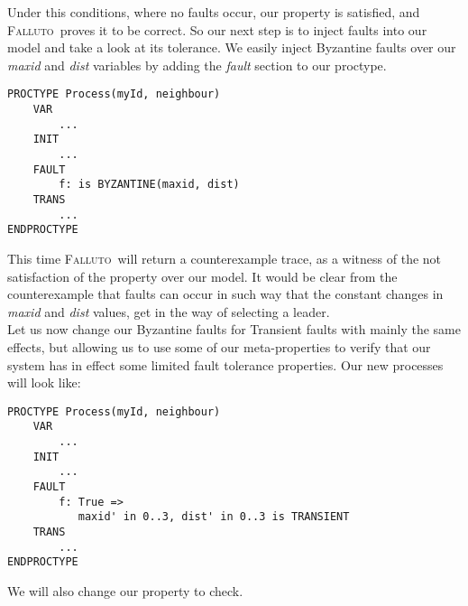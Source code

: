 \documentclass{llncs2e/llncs}
\newcommand{\fallutoSp}{\nohyphens{\textsc{Falluto~}}}  %
\begin{document}
\vspace{-0.2cm}
\noindent Under this conditions, where no faults occur, our property is satisfied, and \fallutoSp proves it to be correct. So our next step is to inject faults into our model and take a look at its tolerance. We easily inject Byzantine faults over our \textit{maxid} and \textit{dist} variables by adding the \textit{fault} section to our proctype.
\vspace{-0.2cm}
\begin{shaded}
\vspace{-0.5cm}
\begin{verbatim}
PROCTYPE Process(myId, neighbour)
    VAR
        ...
    INIT
        ...
    FAULT
        f: is BYZANTINE(maxid, dist)
    TRANS
        ...
ENDPROCTYPE
\end{verbatim}
\vspace{-0.5cm}
\end{shaded}
\vspace{-0.3cm}
\noindent This time \fallutoSp will return a counterexample trace, as a witness of the not satisfaction of the property over our model. It would be clear from the counterexample that faults can occur in such way that the constant changes in \textit{maxid} and \textit{dist} values, get in the way of selecting a leader.\\
Let us now change our Byzantine faults for Transient faults with mainly the same effects, but allowing us to use some of our meta-properties to verify that our system has in effect some limited fault tolerance properties. Our new processes will look like:
\vspace{-0.3cm}
\begin{shaded}
\vspace{-0.5cm}
\begin{verbatim}
PROCTYPE Process(myId, neighbour)
    VAR
        ...
    INIT
        ...
    FAULT
        f: True => 
           maxid' in 0..3, dist' in 0..3 is TRANSIENT
    TRANS
        ...
ENDPROCTYPE
\end{verbatim}
\vspace{-0.5cm}
\end{shaded}
\vspace{-0.3cm}
\noindent We will also change our property to check.
\vspace{-0.3cm}
\end{document}
